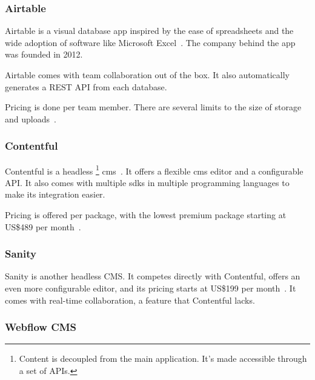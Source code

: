 \subsubsection{Airtable}


Airtable is a visual database app inspired by the ease of spreadsheets
and the wide adoption of software like Microsoft Excel~\autocite{noauthor_airtable_nodate}.
The company behind the app was founded in 2012.

Airtable comes with team collaboration out of the box. It also
automatically generates a REST API from each database.

Pricing is done per team member.
There are several limits to the size of storage and uploads~\autocite{noauthor_airtable_nodate}.

\subsubsection{Contentful}


Contentful is a headless
\footnote{Content is decoupled from the main application.
	It's made accessible through a set of APIs.}
\acrfull{cms}~\autocite{noauthor_api-first_nodate}.
It offers a flexible \acrshort{cms} editor and a configurable API.
It also comes with multiple \acrshort{sdk}s in multiple programming languages to make its integration easier.

Pricing is offered per package, with the lowest premium package starting at US\$489 per month~\autocite{noauthor_api-first_nodate}.

\subsubsection{Sanity}


Sanity is another headless CMS.
It competes directly with Contentful, offers an even more configurable editor, and its pricing starts at US\$199 per month~\autocite{noauthor_unified_nodate}.
It comes with real-time collaboration, a feature that Contentful lacks.

\subsubsection{Webflow CMS}

